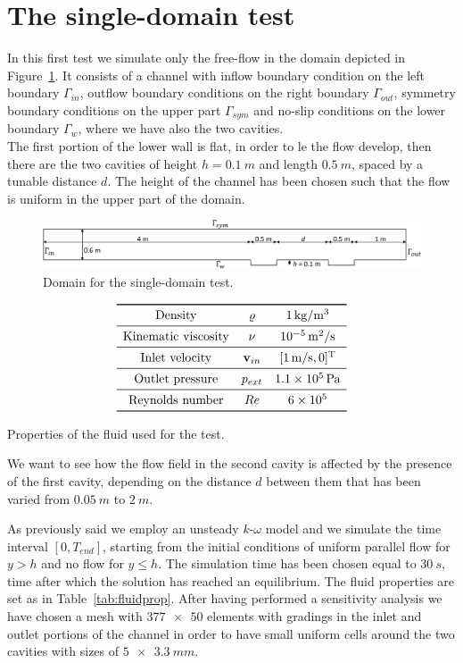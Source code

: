 \documentclass[11pt, a4paper]{article}
\theoremstyle{definition}
\begin{document}
\section{The single-domain test}
In this first test we simulate only the free-flow in the domain depicted in 
Figure~\ref{fig:singledomain}. It consists of a channel with inflow boundary 
condition on the left boundary $\Gamma_{in}$, outflow boundary conditions on 
the 
right boundary $\Gamma_{out}$, symmetry boundary conditions on the upper part 
$\Gamma_{sym}$ and no-slip conditions on the lower boundary $\Gamma_w$, where 
we have also the two cavities.\\
The first portion of the lower wall is flat, in order to le the flow develop, 
then there are the two cavities of height $h=\SI{0.1}{m}$ and length 
$\SI{0.5}{m}$, spaced by a tunable distance $d$. The height of the channel has 
been chosen such that the flow is uniform in the upper part of the domain. 
\begin{figure}[h]
	\centering
	\includegraphics[width=\textwidth]{cavities_domain}
	\caption{Domain for the single-domain test.}
	\label{fig:singledomain}
\end{figure}
\begin{table}[h]
	\centering
	\[
	\begin{array}{ccc}
	\toprule
	\text{Density} & \varrho & \SI{1}{kg/m^3}\\
	\midrule
	\text{Kinematic viscosity} & \nu & \SI{e-5}{m^2/s}\\
	\midrule
	\text{Inlet velocity} & \mathbf{v}_{in} & [\SI{1}{m/s}, 0]^\mathrm{T}\\
	\midrule
	\text{Outlet pressure} & p_{ext} & \SI{1.1e5}{Pa}\\
	\midrule
	\text{Reynolds number} & Re & \num{6e5}\\
	\bottomrule
	\end{array}
	\]
	\caption{Properties of the fluid used for the test.}
	\label{tab:fluidprop}
\end{table}

We want to see how the flow field in the second cavity is affected by the 
presence of the first cavity, depending on the distance $d$ between them that 
has been varied from $\SI{0.05}{m}$ to $\SI{2}{m}$.

As previously said we employ an unsteady $k\text{-}\omega$ model and we 
simulate the time interval $[0, T_{end}]$, starting from the initial 
conditions of uniform parallel flow for $y>h$ and no flow for $y\leq h$. The 
simulation time has been chosen equal to $\SI{30}{s}$, time after which 
the solution has reached an equilibrium.
The fluid properties are set as in Table~\ref{tab:fluidprop}. After having 
performed a sensitivity analysis we have chosen a mesh with $\num{377x50}{}$ 
elements with gradings in the inlet and outlet portions of the channel in order 
to have small uniform cells around the two cavities with sizes of 
$\SI{5x3.3}{mm}$.
\end{document}
